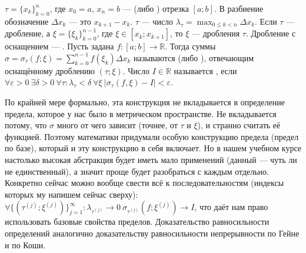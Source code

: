 \documentclass{article}
\begin{document}
\begin{itemize}
\begin{Comment}
\begin{center}
            \end{center}
        \end{Comment}
        \dfn $\tau=\{x_k\}_{k=0}^n$, где $x_0=a$, $x_n=b$ ---  (либо ) отрезка $[a;b]$. В разбиение обозначение $\Delta x_k$ --- это $x_{k+1}-x_k$.
        \dfn {} $\tau$ --- число $\lambda_\tau=\max_{0\leqslant k<n}\Delta x_k$.
        \dfn Если $\tau$ --- дробление, а $\xi=\{\xi_k\}_{k=0}^{n-1}$, где $\xi\in[x_k;x_{k+1}]$, то $\xi$ ---  дробления $\tau$.
        \dfn Дробление с оснащением --- .
        \dfn Пусть задана $f\colon[a;b]\to\mathbb R$. Тогда суммы $\sigma=\sigma_\tau(f;\xi)=\sum\limits_{k=0}^{n-1}f(\xi_k)\Delta x_k$ называются  (либо ), отвечающим оснащённому дроблению $(\tau;\xi)$.
        \dfn Число $I\in\mathbb R$ называется , если $\forall\varepsilon>0~\exists\delta>0~\forall\tau:\lambda_\tau<\delta~\forall\xi~|\sigma_\tau(f,\xi)-I|<\varepsilon$.
        \begin{Comment}
            По крайней мере формально, эта конструкция не вкладывается в определение предела, которое у нас было в метрическом пространстве. Не вкладывается потому, что $\sigma$ много от чего зависит (точнее, от $\tau$ и $\xi$), и странно считать её функцией. Поэтому математики придумали особую конструкцию предела (предел по базе), который и эту конструкцию в себя включает. Но в нашем учебном курсе настолько высокая абстракция будет иметь мало применений (данный --- чуть ли не единственный), а значит проще будет разобраться с каждым отдельно. Конкретно сейчас можно вообще свести всё к последовательностям (индексы которых му напишем сейчас сверху): $\forall\{(\tau^{(j)};\xi^{(j)})\}_{j=1}^\infty:\lambda_{\tau^{(j)}}\to0~\sigma_{\tau^{(j)}}(f;\xi^{(j)})\to I$, что даёт нам право использовать базовые свойства пределов. Доказательство равносильности определений аналогично доказательству равносильности непрерывности по Гейне и по Коши.

\end{Comment}
\end{itemize}
\end{document}
